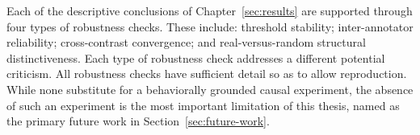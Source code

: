 Each of the descriptive conclusions of Chapter~\ref{sec:results} are supported through four types of robustness checks. These include: threshold stability; inter-annotator reliability; cross-contrast convergence; and real-versus-random structural distinctiveness. Each type of robustness check addresses a different potential criticism. All robustness checks have sufficient detail so as to allow reproduction. While none substitute for a behaviorally grounded causal experiment, the absence of such an experiment is the most important limitation of this thesis, named as the primary future work in Section~\ref{sec:future-work}.
